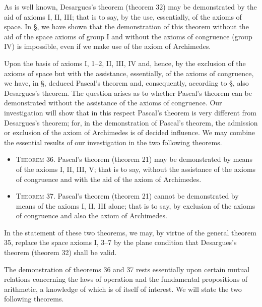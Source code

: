 \documentclass[11pt,oneside]{book}
\begin{document}
As is well known, Desargues's theorem (theorem 32)
may be demonstrated by the aid of axioms I, II,
III; that is to say, by the use, essentially, of the axioms
of space. In \S{}, we have shown that the demonstration
of this theorem without the aid of the space
axioms of group I and without the axioms of congruence
(group IV) is impossible, even if we make use
of the axiom of Archimedes.

Upon the basis of axioms I, 1--2, II, III, IV and,
hence, by the exclusion of the axioms of space but
with the assistance, essentially, of the axioms of congruence,
we have, in \S{}, deduced Pascal's theorem
and, consequently, according to \S{}, also Desargues's
theorem. The question arises as to whether Pascal's
theorem can be demonstrated without the assistance
of the axioms of congruence. Our investigation will
show that in this respect Pascal's theorem is very different
from Desargues's theorem; for, in the demonstration
of Pascal's theorem, the admission or exclusion
of the axiom of Archimedes is of decided influence.
We may combine the essential results of our investigation
in the two following theorems.

\begin{itemize}
\item[]{\scshape Theorem 36.} Pascal's theorem (theorem 21) may
be demonstrated by means of the axioms I, II,
\label{folio101}
III, V; that is to say, without the assistance
of the axioms of congruence and with the aid
of the axiom of Archimedes.
\end{itemize}

\begin{itemize}
\item[]{\scshape Theorem 37.} Pascal's theorem (theorem 21) cannot
be demonstrated by means of the axioms I,
II, III alone; that is to say, by exclusion of
the axioms of congruence and also the axiom
of Archimedes.
\end{itemize}

In the statement of these two theorems, we may,
by virtue of the general theorem 35, replace the space
axioms I, 3--7 by the plane condition that Desargues's
theorem (theorem 32) shall be valid.

\label{p32}

The demonstration of theorems 36 and 37 rests
essentially upon certain mutual relations concerning
the laws of operation and the fundamental propositions
of arithmetic, a knowledge of which is of itself
of interest. We will state the two following theorems.
\end{document}
